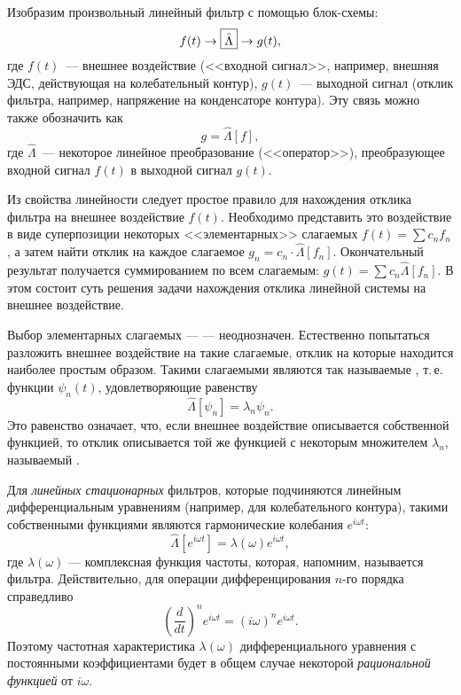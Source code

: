 Изобразим произвольный линейный фильтр с помощью блок-схемы:
\begin{equation*}
f(t)\to\fbox{$\hat\Lambda$} \to g(t),
\end{equation*}
где $f(t)$~--- внешнее воздействие (<<входной сигнал>>, например, внешняя
ЭДС, действующая на колебательный контур), $g(t)$~--- выходной сигнал
(отклик фильтра, например, напряжение на конденсаторе контура).
Эту связь можно также обозначить как
\begin{equation*}
g=\hat\Lambda [f],
\end{equation*}
где $\hat\Lambda$~--- некоторое линейное преобразование (<<оператор>>),
преобразующее входной сигнал $f(t)$ в выходной сигнал $g(t)$.

Из свойства линейности следует простое правило для нахождения
отклика фильтра на  внешнее воздействие $f(t)$.
Необходимо представить это воздействие в виде суперпозиции некоторых
<<элементарных>> слагаемых $f(t)=\sum c_n f_n$, а затем найти отклик на каждое
слагаемое $g_n = c_n \cdot \hat \Lambda [f_n]$. Окончательный результат
получается суммированием по всем слагаемым: $g(t)=\sum c_n \hat\Lambda [f_n]$.
В этом состоит суть  решения задачи
нахождения отклика линейной системы на внешнее воздействие.

Выбор элементарных слагаемых ---  --- неоднозначен.
Естественно попытаться разложить внешнее воздействие на такие
слагаемые, отклик на которые находится наиболее простым образом. Такими
слагаемыми являются так называемые
, т.\,е. функции $\psi_n(t)$,
удовлетворяющие равенству
\begin{equation}
    \hat \Lambda[\psi_n]=\lambda_n \psi_n.
\end{equation}
Это равенство означает, что, если внешнее воздействие описывается собственной
функцией, то отклик описывается той же функцией с некоторым множителем
$\lambda_n$, называемый .

Для \emph{линейных стационарных} фильтров, которые подчиняются линейным
дифференциальным уравнениям (например, для колебательного контура),
такими собственными функциями являются гармонические
колебания $e^{i\omega t}$:
\begin{equation*}
\hat\Lambda\left[e^{i\omega t}\right]=\lambda(\omega)e^{i\omega t},
\end{equation*}
где $\lambda(\omega)$ --- комплексная функция частоты, которая, напомним,
называется  фильтра.
Действительно, для операции дифференцирования $n$-го порядка справедливо
\[
\left(\frac{d}{dt}\right)^n e^{i\omega t} = (i\omega)^n e^{i\omega t}.
\]
Поэтому частотная характеристика $\lambda(\omega)$ дифференциального уравнения
с постоянными коэффициентами будет в общем случае некоторой \emph{рациональной
функцией} от $i\omega$.

